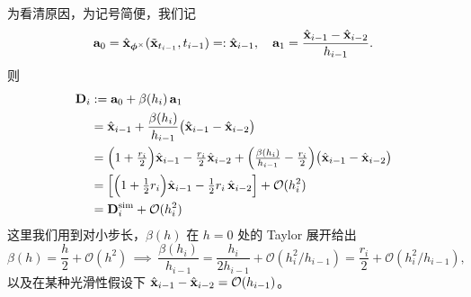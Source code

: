 为看清原因，为记号简便，我们记
\[
{\mathbf{a}}_0=\hat{{\mathbf{x}}}_{\bm{\phi}^\times}(\tilde{{\mathbf{x}}}_{t_{i-1}},t_{i-1})=:\hat{{\mathbf{x}}}_{i-1},\quad
{\mathbf{a}}_1=\frac{\hat{{\mathbf{x}}}_{i-1}-\hat{{\mathbf{x}}}_{i-2}}{h_{i-1}}.
\]
则
\begin{align*}
{\mathbf{D}}_i
&:= {\mathbf{a}}_0+\beta(h_i)\,{\mathbf{a}}_1 
\\
&= \hat{{\mathbf{x}}}_{i-1} + \frac{\beta(h_i)}{h_{i-1}}\big(\hat{{\mathbf{x}}}_{i-1}-\hat{{\mathbf{x}}}_{i-2}\big)
\\
&= \Big(1+\tfrac{r_i}{2}\Big)\hat{{\mathbf{x}}}_{i-1} - \tfrac{r_i}{2}\hat{{\mathbf{x}}}_{i-2}
   + \Big(\tfrac{\beta(h_i)}{h_{i-1}}-\tfrac{r_i}{2}\Big)\big(\hat{{\mathbf{x}}}_{i-1}-\hat{{\mathbf{x}}}_{i-2}\big)
\\
&= \left[\Big(1+\tfrac12 r_i\Big)\hat{{\mathbf{x}}}_{i-1}-\tfrac12 r_i\,\hat{{\mathbf{x}}}_{i-2}\right]
   + \mathcal O(h_i^2)
   \\&={\mathbf{D}}_i^{\mathrm{sim}}
   + \mathcal O(h_i^2)
\end{align*}
这里我们用到对小步长，$\beta(h)$ 在 $h=0$ 处的 Taylor 展开给出
\[
\beta(h)=\frac{h}{2}+\mathcal{O}(h^{2})
\,\implies\,
\frac{\beta(h_i)}{h_{i-1}}
=\frac{h_i}{2h_{i-1}}+\mathcal{O}(h_i^{2}/h_{i-1})
=\frac{r_i}{2}+\mathcal{O}(h_i^{2}/h_{i-1}),
\]
以及在某种光滑性假设下 $\hat{{\mathbf{x}}}_{i-1}- \hat{{\mathbf{x}}}_{i-2} = \mathcal{O}(h_{i-1})$。



